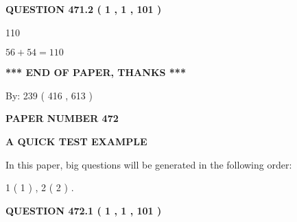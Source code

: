 \documentclass[12pt]{article}
\begin{document}
{\textbf{\Large{QUESTION
471.2 
 ( 1 , 1 , 101 )
}}}
  
  
 
 
\noindent{}

110
 
 
 
 
\noindent{}

$ %
56 +  %
54=   %
110$
 
 
   
   
 \vspace{0.2in}
 
   
   
   
   
\vspace{1.0in} 
{\textbf{\large{ *** END OF PAPER, THANKS *** }}} 
   
   
\hspace{1.0in} By: 
 239 ( 416 ,  613 )
   
   
   
   
\newpage 
\setcounter{page}{ 
   472001 } 
   
   
   
   
 {\textbf{ \Large{ PAPER NUMBER  472  }}}
   
   
\vspace{0.2in}
   
   
   
   
   
   
 \vspace{0.2in}
{\LARGE {\textbf{ A QUICK TEST EXAMPLE}}}
   
   
   
\vspace{0.2in}
   
In this paper, big questions will be generated in the following order: 
   
   
   1 ( 1 )
 ,
   2 ( 2 )
 .
  
\vspace{0.2in}
  
{\textbf{\Large{QUESTION
472.1 
 ( 1 , 1 , 101 )
}}}
  
  
 
 
\noindent{}
\end{document}
